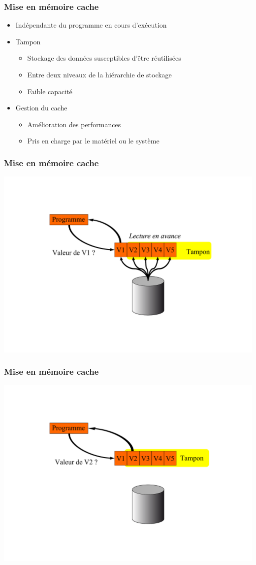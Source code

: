 \begin{frame}
\frametitle{Mise en mémoire cache}
\begin{itemize}
\item Indépendante du programme en cours d'exécution
\item Tampon
\begin{itemize}
\item Stockage des données susceptibles d’être réutilisées
\item Entre deux niveaux de la hiérarchie de stockage
\item Faible capacité
\end{itemize}
\item Gestion du cache
\begin{itemize}
\item Amélioration des performances
\item Pris en charge par le matériel ou le système
\end{itemize}
\end{itemize}
\end{frame}



\begin{frame}
\frametitle{Mise en mémoire cache}
\includegraphics[width=.9\textwidth]{../illustration/cache_lecture_en_avance.pdf}
\end{frame}


\begin{frame}
\frametitle{Mise en mémoire cache}
\includegraphics[width=.9\textwidth]{../illustration/cache_lecture_en_avance2.pdf}
\end{frame}


